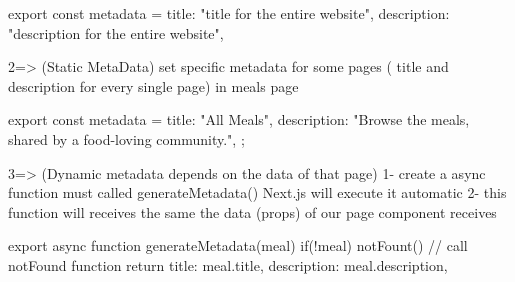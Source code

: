             export const metadata = {
                title: "title for the entire website",
                description: "description for the entire website",
            }


    2=> (Static MetaData) set specific metadata for some pages ( title and description for every single page)
            in meals page 
                    
                export const metadata = {
                    title: "All Meals",
                    description: "Browse the meals, shared by a food-loving community.",
                };

    3=> (Dynamic metadata depends on the data of that page)
        1- create a async function must called generateMetadata() Next.js will execute it automatic
        2- this function will receives the same the data (props) of our page component receives 

        export async function generateMetadata({meal}){
            if(!meal){
                notFount() // call notFound function 
            }
            return{
                title: meal.title,
                description: meal.description,
            }
        }   


